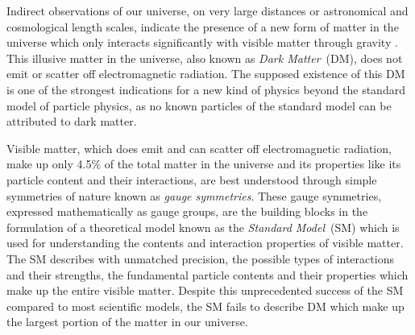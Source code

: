 \par
  Indirect observations of our universe, on very large distances or astronomical and cosmological length scales, indicate the presence of a new form of matter in the universe which only interacts significantly with visible matter through gravity \cite{DM}. This illusive matter in the universe, also known as \textit{Dark Matter}~(DM), does not emit or scatter off electromagnetic radiation.
The supposed existence of this DM is one of the strongest indications for a new kind of physics beyond the standard model of particle physics, as no known particles of the standard model can be attributed to dark matter. 
\par
Visible matter, which does emit and can scatter off electromagnetic radiation, make up only 4.5\% of the total matter in the universe and its properties like its particle content and their interactions, are best understood through simple symmetries of nature known as \textit{gauge symmetries}. These gauge symmetries, expressed mathematically as gauge groups, are the building blocks in the formulation of a theoretical model known as the \textit{Standard Model}~(SM) which is used for understanding the contents and interaction properties of visible matter. The SM describes with unmatched precision, the possible types of interactions and their strengths, the fundamental particle contents and their properties which make up the entire visible matter.  Despite this unprecedented success of the SM compared to most scientific models, the SM fails to describe DM which make up the largest portion of the matter in our universe. 
